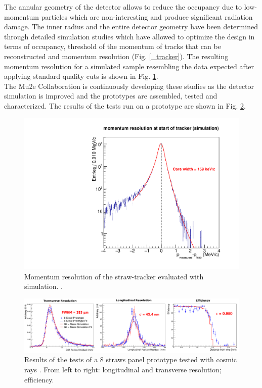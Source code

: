 \documentclass[12pt,a4paper,openright, oneside, titlepage]{book} %
\begin{document}
\noindent
The annular geometry of the detector allows to reduce the occupancy due to low-momentum particles which are non-interesting and produce significant radiation damage.
The inner radius and the entire detector geometry have been determined through detailed 
simulation studies which 
have allowed to optimize the design in terms of occupancy, threshold of the momentum 
of tracks that can be reconstructed and momentum resolution (Fig. \ref{_tracker}).
The resulting momentum resolution for a simulated sample resembling the data expected after applying 
standard quality cuts is shown in Fig. \ref{_Tracker_resolution}.\\
The Mu2e Collaboration is continuously developing these studies as the detector simulation is improved and the prototypes are assembled, tested and characterized. The results of the tests run on a prototype are shown in Fig. \ref{_Tracker_prototype}.


\begin{figure}[h!]
\centering
\includegraphics[scale=0.3]{Tracker_resolution}
\caption[Tracker simulated resolution]{Momentum resolution of the straw-tracker evaluated with  simulation. \cite{Giovannella}.}
\label{_Tracker_resolution}
\end{figure}

\begin{figure}[h!]
\centering
\includegraphics[scale=0.7]{Tracker_prototype}
\caption[Tracker prototype results]{Results of the tests of a 8 straws panel prototype tested with cosmic rays \cite{Giovannella}. 
From left to right: longitudinal and transverse resolution; efficiency.}
\label{_Tracker_prototype}
\end{figure}
\end{document}
